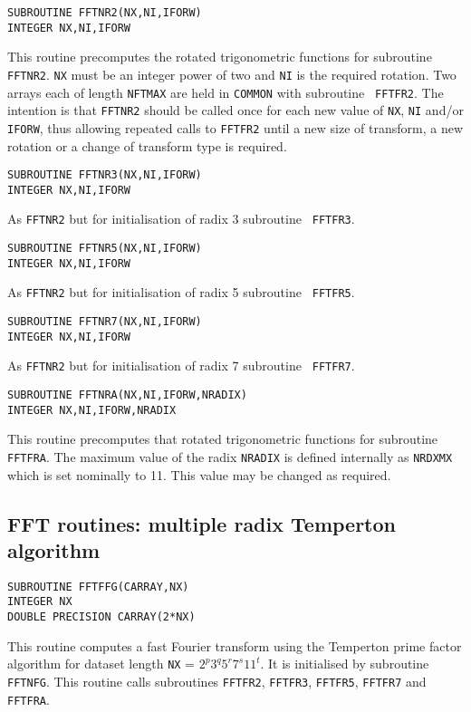 \documentclass[dvips]{article}
\begin{document}
\begin{verbatim}
SUBROUTINE FFTNR2(NX,NI,IFORW)
INTEGER NX,NI,IFORW
\end{verbatim}
This routine precomputes the rotated
trigonometric functions for subroutine {\tt FFTNR2}.
{\tt NX} must be an integer power of two and {\tt NI} is the
required rotation.  Two arrays each of
length {\tt NFTMAX} are held in {\tt COMMON} with subroutine {\tt
FFTFR2}.
The intention is that {\tt FFTNR2} should be called once
for each new value of {\tt NX}, {\tt NI} and/or {\tt IFORW}, thus allowing 
repeated calls to {\tt FFTFR2} until a new size of transform, a new
rotation or a change of transform type is required.

\begin{verbatim}
SUBROUTINE FFTNR3(NX,NI,IFORW)
INTEGER NX,NI,IFORW
\end{verbatim}
As {\tt FFTNR2} but for initialisation of radix 3 subroutine {\tt
FFTFR3}.\\

\begin{verbatim}
SUBROUTINE FFTNR5(NX,NI,IFORW)
INTEGER NX,NI,IFORW
\end{verbatim}
As {\tt FFTNR2} but for initialisation of radix 5 subroutine {\tt
FFTFR5}.\\

\begin{verbatim}
SUBROUTINE FFTNR7(NX,NI,IFORW)
INTEGER NX,NI,IFORW
\end{verbatim}
As {\tt FFTNR2} but for initialisation of radix 7 subroutine {\tt
FFTFR7}.\\

\begin{verbatim}
SUBROUTINE FFTNRA(NX,NI,IFORW,NRADIX)
INTEGER NX,NI,IFORW,NRADIX
\end{verbatim}
This routine precomputes that rotated trigonometric functions for
subroutine {\tt FFTFRA}.
The maximum value of the radix {\tt NRADIX} is defined internally as
{\tt NRDXMX} which is set nominally to 11.  This value may be changed as
required.

\subsection*{FFT routines: multiple radix Temperton algorithm}
\begin{verbatim}
SUBROUTINE FFTFFG(CARRAY,NX)
INTEGER NX
DOUBLE PRECISION CARRAY(2*NX)
\end{verbatim}
This routine computes a fast Fourier transform using the Temperton prime
factor algorithm for dataset length {\tt NX} = $2^{p}3^{q}5^{r}7^{s}11^{t}$.
It is initialised by subroutine {\tt FFTNFG}.
This routine calls subroutines {\tt FFTFR2}, {\tt FFTFR3}, {\tt FFTFR5},
{\tt FFTFR7} and {\tt FFTFRA}.
\end{document}

